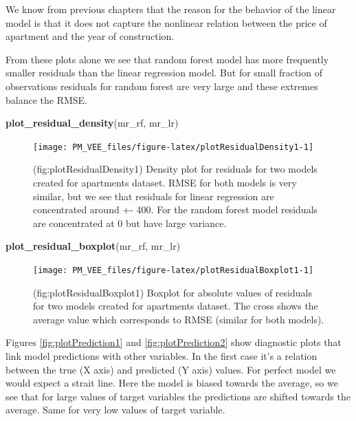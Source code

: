 \documentclass[12pt,]{krantz}
\newenvironment{Shaded}{\begin{snugshade}}{\end{snugshade}}
\newcommand{\KeywordTok}[1]{\textcolor[rgb]{0.13,0.29,0.53}{\textbf{#1}}}
\newcommand{\NormalTok}[1]{#1}
\begin{document}
We know from previous chapters that the reason for the behavior of the linear model is that it does not capture the nonlinear relation between the price of apartment and the year of construction.

From these plots alone we see that random forest model has more frequently smaller residuals than the linear regression model. But for small fraction of observations residuals for random forest are very large and these extremes balance the RMSE.

\begin{Shaded}
\begin{Highlighting}[]
\KeywordTok{plot_residual_density}\NormalTok{(mr_rf, mr_lr)}
\end{Highlighting}
\end{Shaded}

\begin{figure}

{\centering \texttt{[image: PM\_VEE\_files/figure-latex/plotResidualDensity1-1]} 

}

\caption{(fig:plotResidualDensity1) Density plot for residuals for two models created for apartments dataset. RMSE for both models is very similar, but we see that residuals for linear regression are concentrated around +- 400. For the random forest model residuals are concentrated at 0 but have large variance.}\label{fig:plotResidualDensity1}
\end{figure}

\begin{Shaded}
\begin{Highlighting}[]
\KeywordTok{plot_residual_boxplot}\NormalTok{(mr_rf, mr_lr)}
\end{Highlighting}
\end{Shaded}

\begin{figure}

{\centering \texttt{[image: PM\_VEE\_files/figure-latex/plotResidualBoxplot1-1]} 

}

\caption{(fig:plotResidualBoxplot1) Boxplot for absolute values of residuals for two models created for apartments dataset. The cross shows the average value which corresponds to RMSE (similar for both models).}\label{fig:plotResidualBoxplot1}
\end{figure}

Figures \ref{fig:plotPrediction1} and \ref{fig:plotPrediction2} show diagnostic plots that link model predictions with other variables. In the first case it's a relation between the true (X axis) and predicted (Y axis) values. For perfect model we would expect a strait line. Here the model is biased towards the average, so we see that for large values of target variables the predictions are shifted towards the average. Same for very low values of target variable.
\end{document}
